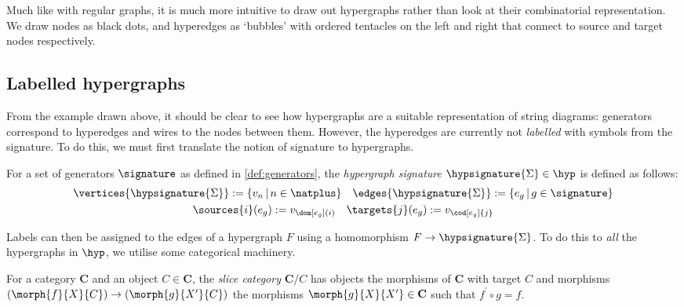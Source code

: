 Much like with regular graphs, it is much more intuitive to draw out hypergraphs
rather than look at their combinatorial representation.
We draw nodes as black dots, and hyperedges as `bubbles' with ordered tentacles
on the left and right that connect to source and target nodes respectively.

\begin{example}
\end{example}

\subsection{Labelled hypergraphs}

From the example drawn above, it should be clear to see how hypergraphs are a
suitable representation of string diagrams: generators correspond to hyperedges
and wires to the nodes between them.
However, the hyperedges are currently not \emph{labelled} with symbols from the
signature.
To do this, we must first translate the notion of signature to hypergraphs.

\begin{definition}
    For a set of generators \(\signature\) as defined in \cref{def:generators},
    the \emph{hypergraph signature} \(\hypsignature{\Sigma} \in \hyp\) is
    defined as follows:
    \begin{gather*}
        \vertices{\hypsignature{\Sigma}} := \{ v_n \,|\, n \in \natplus\}
        \quad
        \edges{\hypsignature{\Sigma}} := \{ e_g \,|\, g \in \signature\}
        \\
        \sources{i}(e_g) := v_{\dom[e_g](i)}
        \quad
        \targets{j}(e_g) := v_{\cod[e_g]{j}}
    \end{gather*}
\end{definition}

\begin{example}
\end{example}

Labels can then be assigned to the edges of a hypergraph \(F\) using a
homomorphism \(F \to \hypsignature{\Sigma}\).
To do this to \emph{all} the hypergraphs in \(\hyp\), we utilise some
categorical machinery.

\begin{definition}
    For a category \(\mathbf{C}\) and an object \(C \in \mathbf{C}\), the
    \emph{slice category} \(\mathbf{C} / C\) has objects the morphisms of
    \(\mathbf{C}\) with target \(C\) and morphisms
    \((\morph{f}{X}{C}) \to (\morph{g}{X^\prime}{C})\) the morphisms
    \(\morph{g}{X}{X^\prime} \in \mathbf{C}\) such that \(f^\prime\circ g = f\).
\end{definition}

